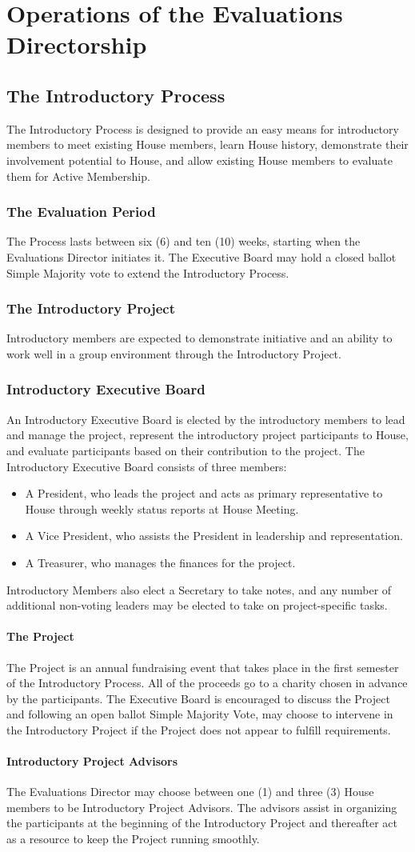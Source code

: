 \documentclass{article}
\newcommand{\bylaw}[1]{\section{#1} \label{#1}}
\newcommand{\bsection}[1]{\subsection{#1} \label{#1}}
\newcommand{\bsubsection}[1]{\subsubsection{#1} \label{#1}}
\newcommand{\bsubsubsection}[1]{\paragraph{#1} \label{#1}}
\begin{document}
\bylaw{Operations of the Evaluations Directorship}
\bsection{The Introductory Process}
The Introductory Process is designed to provide an easy means for introductory members to meet existing House members, learn House history, demonstrate their involvement potential to House, and allow existing House members to evaluate them for Active Membership.
\bsubsection{The Evaluation Period}
The Process lasts between six (6) and ten (10) weeks, starting when the Evaluations Director initiates it. The Executive Board may hold a closed ballot Simple Majority vote to extend the Introductory Process.
\bsubsection{The Introductory Project}
Introductory members are expected to demonstrate initiative and an ability to work well in a group environment through the Introductory Project.
\bsubsection{Introductory Executive Board}
An Introductory Executive Board is elected by the introductory members to lead and manage the project, represent the introductory project participants to House, and evaluate participants based on their contribution to the project. The Introductory Executive Board consists of three members:
\begin{itemize}
	\item A President, who leads the project and acts as primary representative to House through weekly status reports at House Meeting.
	\item A Vice President, who assists the President in leadership and representation.
	\item A Treasurer, who manages the finances for the project.
\end{itemize}
Introductory Members also elect a Secretary to take notes, and any number of additional non-voting leaders may be elected to take on project-specific tasks.
\bsubsubsection{The Project} 
The Project is an annual fundraising event that takes place in the first semester of the Introductory Process. All of the proceeds go to a charity chosen in advance by the participants. The Executive Board is encouraged to discuss the Project and following an open ballot Simple Majority Vote, may choose to intervene in the Introductory Project if the Project does not appear to fulfill requirements.
\bsubsubsection{Introductory Project Advisors} 
The Evaluations Director may choose between one (1) and three (3) House members to be Introductory Project Advisors. The advisors assist in organizing the participants at the beginning of the Introductory Project and thereafter act as a resource to keep the Project running smoothly.
\end{document}
